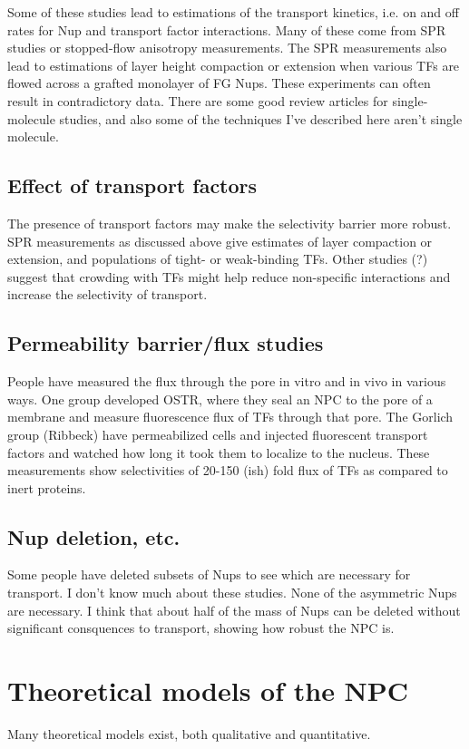 Some of these studies lead to estimations of the transport kinetics, i.e. on and off rates for Nup and transport factor interactions.  Many of these come from SPR studies or stopped-flow anisotropy measurements.  The SPR measurements also lead to estimations of layer height compaction or extension when various TFs are flowed across a grafted monolayer of FG Nups.  These experiments can often result in contradictory data.  There are some good review articles for single-molecule studies, and also some of the techniques I've described here aren't single molecule.
\subsection{Effect of transport factors}
The presence of transport factors may make the selectivity barrier more robust.  SPR measurements as discussed above give estimates of layer compaction or extension, and populations of tight- or weak-binding TFs.  Other studies (?) suggest that crowding with TFs might help reduce non-specific interactions and increase the selectivity of transport.
\subsection{Permeability barrier/flux studies}
People have measured the flux through the pore in vitro and in vivo in various ways.  One group developed OSTR, where they seal an NPC to the pore of a membrane and measure fluorescence flux of TFs through that pore.  The Gorlich group (Ribbeck) have permeabilized cells and injected fluorescent transport factors and watched how long it took them to localize to the nucleus.  These measurements show selectivities of 20-150 (ish) fold flux of TFs as compared to inert proteins.
\subsection{Nup deletion, etc.}
Some people have deleted subsets of Nups to see which are necessary for transport.  I don't know much about these studies.  None of the asymmetric Nups are necessary.  I think that about half of the mass of Nups can be deleted without significant consquences to transport, showing how robust the NPC is.
\section{Theoretical models of the NPC}
Many theoretical models exist, both qualitative and quantitative.
